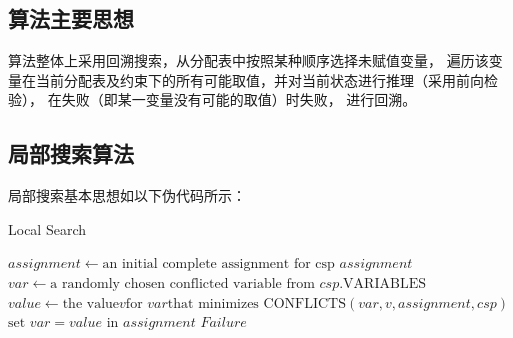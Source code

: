 \documentclass[UTF8]{article}
\begin{document}
    \subsection{算法主要思想}
    算法整体上采用回溯搜索，从分配表中按照某种顺序选择未赋值变量，
    遍历该变量在当前分配表及约束下的所有可能取值，并对当前状态进行推理（采用前向检验），
    在失败（即某一变量没有可能的取值）时失败，
    进行回溯。
    \subsection{局部搜索算法}
    局部搜索基本思想如以下伪代码所示：
    \begin{algorithm}[H]
        \caption{Local Search}
        \begin{algorithmic}
            \State $assignment \gets \text{an initial complete assignment for csp}$
                    \State \Return $assignment$
                \EndIf
                \State $var \gets \text{a randomly chosen conflicted variable from } csp.\text{VARIABLES}$
                \State $value \gets \text{the value} v \text{for } var \text{that minimizes } \text{CONFLICTS}(var, v, assignment, csp)$
                \State {}
                \State $\text{set } var = value \text{ in } assignment$
            \EndFor
            \State \Return $Failure$
        \end{algorithmic}
    \end{algorithm}
\end{document}
